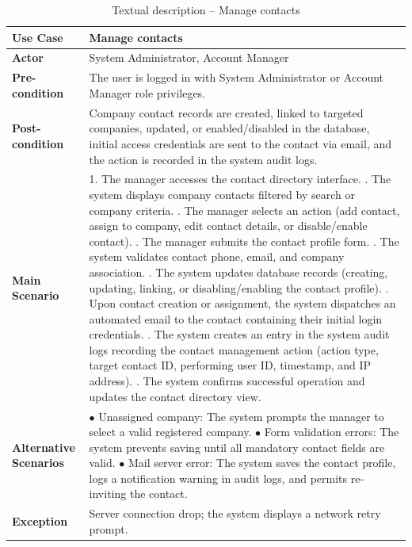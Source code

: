 \documentclass[12pt,a4paper]{report}
\begin{document}
\begin{table}[H]
\centering
\caption{Textual description -- Manage contacts}
\label{tab:refinement_manage_contacts}
\vspace{0.2cm}
\small
\renewcommand{\arraystretch}{1.15}
\begin{tabular}{|p{3.5cm}|p{12.0cm}|}
\hline
\textbf{Use Case} & Manage contacts \\ \hline
\textbf{Actor} & System Administrator, Account Manager \\ \hline
\textbf{Pre-condition} & The user is logged in with System Administrator or Account Manager role privileges. \\ \hline
\textbf{Post-condition} & Company contact records are created, linked to targeted companies, updated, or enabled/disabled in the database, initial access credentials are sent to the contact via email, and the action is recorded in the system audit logs. \\ \hline
\textbf{Main Scenario} & 
1. The manager accesses the contact directory interface. \newline
2. The system displays company contacts filtered by search or company criteria. \newline
3. The manager selects an action (add contact, assign to company, edit contact details, or disable/enable contact). \newline
4. The manager submits the contact profile form. \newline
5. The system validates contact phone, email, and company association. \newline
6. The system updates database records (creating, updating, linking, or disabling/enabling the contact profile). \newline
7. Upon contact creation or assignment, the system dispatches an automated email to the contact containing their initial login credentials. \newline
8. The system creates an entry in the system audit logs recording the contact management action (action type, target contact ID, performing user ID, timestamp, and IP address). \newline
9. The system confirms successful operation and updates the contact directory view. \\ \hline
\textbf{Alternative Scenarios} & 
$\bullet$ Unassigned company: The system prompts the manager to select a valid registered company. \newline
$\bullet$ Form validation errors: The system prevents saving until all mandatory contact fields are valid. \newline
$\bullet$ Mail server error: The system saves the contact profile, logs a notification warning in audit logs, and permits re-inviting the contact. \\ \hline
\textbf{Exception} & Server connection drop; the system displays a network retry prompt. \\ \hline
\end{tabular}
\end{table}
\newpage
\end{document}
